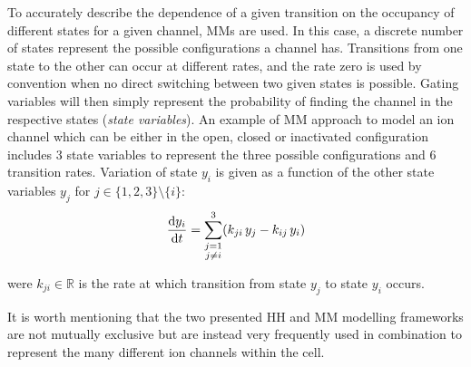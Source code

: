 \vspace{0.2cm}
To accurately describe the dependence of a given transition on the occupancy of different states for a given channel, MMs are used. In this case, a discrete number of states represent the possible configurations a channel has. Transitions from one state to the other can occur at different rates, and the rate zero is used by convention when no direct switching between two given states is possible. Gating variables will then simply represent the probability of finding the channel in the respective states (\textit{state variables}). An example of MM approach to model an ion channel which can be either in the open, closed or inactivated configuration includes $3$ state variables to represent the three possible configurations and $6$ transition rates. Variation of state $y_i$ is given as a function of the other state variables $y_j$ for $j\in\{1,2,3\}\setminus{\{i\}}$:
%
\begin{equation}
    \dfrac{\mathrm{d}{y_i}}{\mathrm{d}{t}} = \sum_{\substack{j=1 \\ j\neq i}}^{3} (k_{ji}\,y_j-k_{ij}\,y_i)
\end{equation}

\noindent
were $k_{ji}\in\mathbb{R}$ is the rate at which transition from state $y_j$ to state $y_i$ occurs.

\vspace{0.5cm}
It is worth mentioning that the two presented HH and MM modelling frameworks are not mutually exclusive but are instead very frequently used in combination to represent the many different ion channels within the cell.



%
%
%
